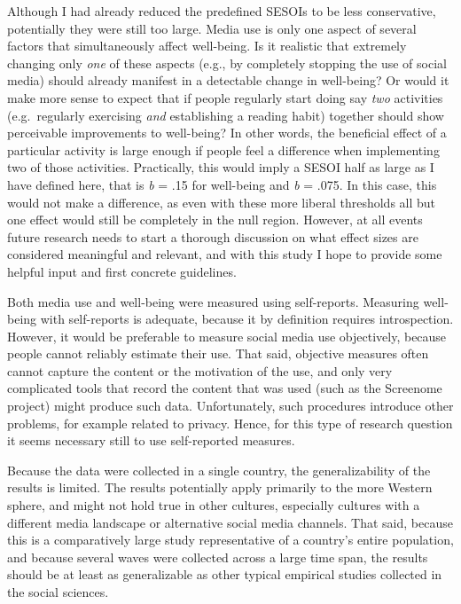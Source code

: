 \documentclass[
  english,
  man,mask,floatsintext]{apa6}
\begin{document}
Although I had already reduced the predefined SESOIs to be less conservative, potentially they were still too large.
Media use is only one aspect of several factors that simultaneously affect well-being.
Is it realistic that extremely changing only \emph{one} of these aspects (e.g., by completely stopping the use of social media) should already manifest in a detectable change in well-being?
Or would it make more sense to expect that if people regularly start doing say \emph{two} activities (e.g.~regularly exercising \emph{and} establishing a reading habit) together should show perceivable improvements to well-being?
In other words, the beneficial effect of a particular activity is large enough if people feel a difference when implementing two of those activities.
Practically, this would imply a SESOI half as large as I have defined here, that is \emph{b} = \textbar.15\textbar{} for well-being and \emph{b} = \textbar.075\textbar.
In this case, this would not make a difference, as even with these more liberal thresholds all but one effect would still be completely in the null region.
However, at all events future research needs to start a thorough discussion on what effect sizes are considered meaningful and relevant, and with this study I hope to provide some helpful input and first concrete guidelines.

Both media use and well-being were measured using self-reports.
Measuring well-being with self-reports is adequate, because it by definition requires introspection.
However, it would be preferable to measure social media use objectively, because people cannot reliably estimate their use.
That said, objective measures often cannot capture the content or the motivation of the use, and only very complicated tools that record the content that was used (such as the Screenome project) might produce such data.
Unfortunately, such procedures introduce other problems, for example related to privacy.
Hence, for this type of research question it seems necessary still to use self-reported measures.

Because the data were collected in a single country, the generalizability of the results is limited.
The results potentially apply primarily to the more Western sphere, and might not hold true in other cultures, especially cultures with a different media landscape or alternative social media channels.
That said, because this is a comparatively large study representative of a country's entire population, and because several waves were collected across a large time span, the results should be at least as generalizable as other typical empirical studies collected in the social sciences.
\end{document}
